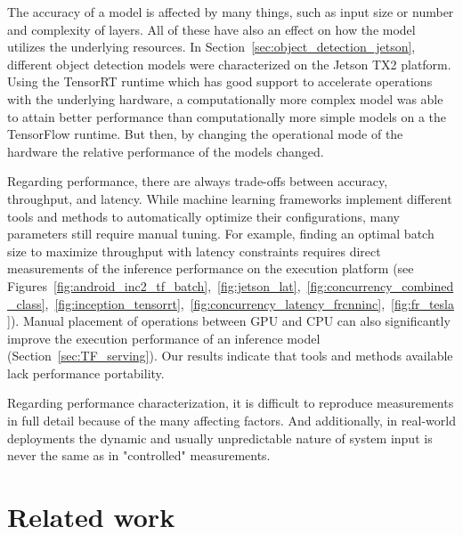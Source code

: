 \documentclass[sigconf]{acmart}
\begin{document}
The accuracy of a model is affected by many things, such as input size or number and complexity of layers. All of these have also an effect on how the model utilizes the underlying resources. In Section~\ref{sec:object_detection_jetson}, different object detection models were characterized on the Jetson TX2 platform. Using the TensorRT runtime which has good support to accelerate operations with the underlying hardware, a computationally more complex model was able to attain better performance than computationally more simple models on a the TensorFlow runtime. But then, by changing the operational mode of the hardware the relative performance of the models changed.

Regarding performance, there are always trade-offs between accuracy, throughput, and latency. While machine learning frameworks implement different tools and methods to automatically optimize their configurations, many parameters still require manual tuning. For example, finding an optimal batch size to maximize throughput with latency constraints requires direct measurements of the inference performance on the execution platform (see Figures~\ref{fig:android_inc2_tf_batch},~\ref{fig:jetson_lat},~\ref{fig:concurrency_combined_class},~\ref{fig:inception_tensorrt},~\ref{fig:concurrency_latency_frcnninc},~\ref{fig:fr_tesla}). Manual placement of operations between GPU and CPU can also significantly improve the execution performance of an inference model (Section~\ref{sec:TF_serving}). Our results indicate that tools and methods available lack performance portability.

Regarding performance characterization, it is difficult to reproduce measurements in full detail because of the many affecting factors. And additionally, in real-world deployments the dynamic and usually unpredictable nature of system input is never the same as in "controlled" measurements.



\section{Related work}\label{sec:relatedwork}
\end{document}
